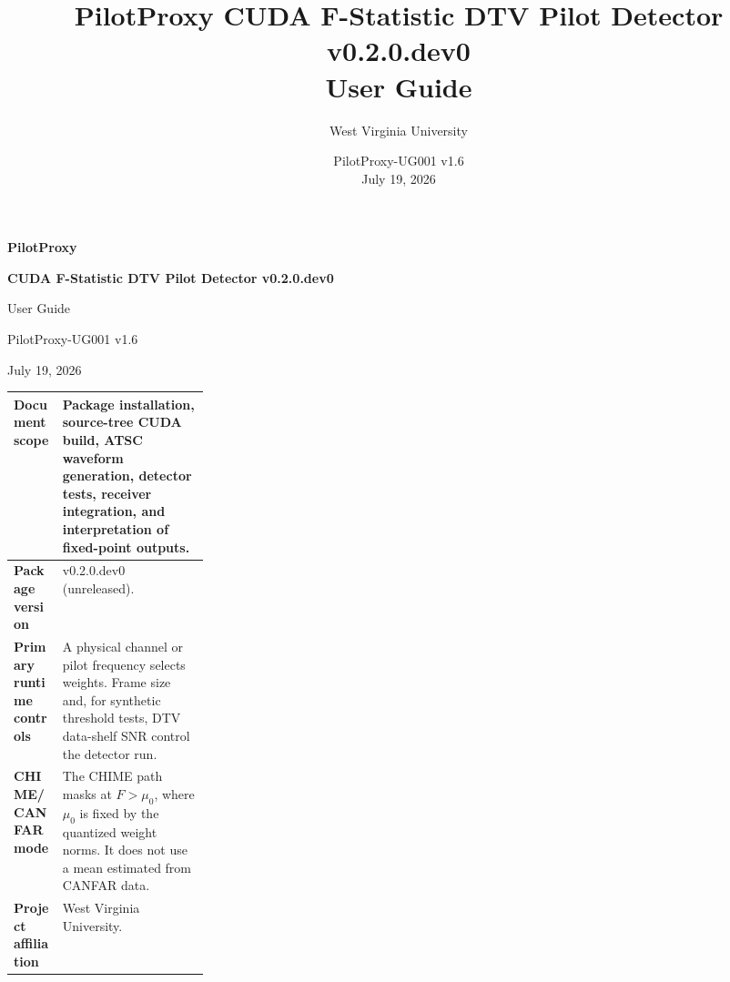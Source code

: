 \documentclass[10pt,letterpaper]{article}
\title{PilotProxy CUDA F-Statistic DTV Pilot Detector v0.2.0.dev0\\User Guide}
\author{West Virginia University}
\date{PilotProxy-UG001 v1.6 \\ July 19, 2026}
\newcommand{\code}[1]{\texttt{\detokenize{#1}}}
\begin{document}
\thispagestyle{empty}
\vspace*{0.25in}
{\fontsize{30}{32}\selectfont\bfseries\color{FStatRed}PilotProxy}\par
\vspace{0.12in}
{\fontsize{23}{26}\selectfont\bfseries CUDA F-Statistic DTV Pilot Detector v0.2.0.dev0}\par
\vspace{0.08in}
{\Large User Guide}\par
\vspace{0.35in}
{\large PilotProxy-UG001 v1.6}\par
{\large July 19, 2026}\par
\vfill
\begin{tabularx}{\linewidth}{|>{\bfseries}L{0.25\linewidth}|Y|}
\hline
Document scope & Package installation, source-tree CUDA build, ATSC waveform generation, detector tests, receiver integration, and interpretation of fixed-point outputs.\\ \hline
Package version & \code{pilot-proxy} v0.2.0.dev0 (unreleased).\\ \hline
Primary runtime controls & A physical channel or pilot frequency selects weights. Frame size and, for synthetic threshold tests, DTV data-shelf SNR control the detector run.\\ \hline
CHIME/CANFAR mode & The CHIME path masks at $F>\mu_0$, where $\mu_0$ is fixed by the quantized weight norms. It does not use a mean estimated from CANFAR data.\\ \hline
Project affiliation & West Virginia University.\\ \hline
\end{tabularx}
\newpage
\end{document}
